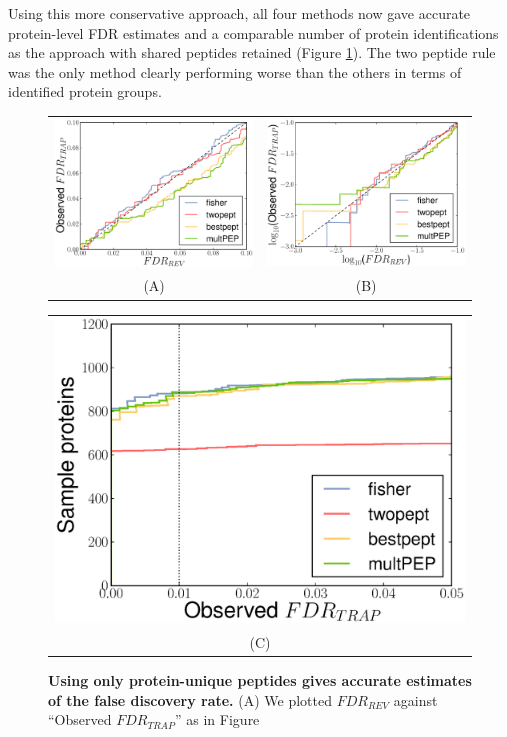\documentclass{article}
\begin{document}
Using this more conservative approach, all four methods now gave
accurate protein-level FDR estimates and a comparable number of
protein identifications as the approach with shared peptides retained
(Figure \ref{fig:unique-accuracy}). The two peptide rule was the only
method clearly performing worse than the others in terms of
identified protein groups.

\begin{figure}[!htp]
\begin{center}
\begin{tabular}{cc} 
\includegraphics[width=0.45\linewidth]{./img/unique-pept-accuracy} &
\includegraphics[width=0.45\linewidth]{./img/unique-pept-accuracy-log}
\\
(A) & (B)
\end{tabular}
\begin{tabular}{c}
\includegraphics[width=0.45\linewidth]{./img/unique-pept-performance}
\\
(C)
\end{tabular}
\caption{\label{fig:unique-accuracy}\textbf{Using only protein-unique
peptides gives accurate estimates of the false discovery rate.} (A) We
plotted $FDR_{REV}$ against ``Observed $FDR_{TRAP}$'' as in Figure
}
\end{center}
\end{figure}
\end{document}
